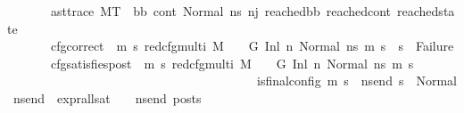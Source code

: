 \begin{isabellebody}
\ \ \ \ \ \ \ ast{\isacharunderscore}{\kern0pt}trace{\isacharcolon}{\kern0pt}\ {\isachardoublequoteopen}M{\isacharcomma}{\kern0pt}{\isasymLambda}{\isacharcomma}{\kern0pt}{\isasymGamma}{\isacharcomma}{\kern0pt}{\isasymOmega}{\isacharcomma}{\kern0pt}T\ {\isasymturnstile}\ {\isacharparenleft}{\kern0pt}bb{\isacharcomma}{\kern0pt}\ cont{}{\isacharcomma}{\kern0pt}\ {\isacharparenleft}{\kern0pt}Normal\ ns{}{\isacharparenright}{\kern0pt}{\isacharparenright}{\kern0pt}\ {\isacharminus}{\kern0pt}n{\isasymlongrightarrow}{\isacharcircum}{\kern0pt}j\ {\isacharparenleft}{\kern0pt}reached{\isacharunderscore}{\kern0pt}bb{\isacharcomma}{\kern0pt}\ reached{\isacharunderscore}{\kern0pt}cont{\isacharcomma}{\kern0pt}\ reached{\isacharunderscore}{\kern0pt}state{\isacharparenright}{\kern0pt}{\isachardoublequoteclose}\isanewline
\ \ \ \ \ \ \ cfg{\isacharunderscore}{\kern0pt}correct{\isacharcolon}{\kern0pt}\ {\isachardoublequoteopen}{\isacharparenleft}{\kern0pt}{\isasymAnd}\ m{}\ s{}{\isachardot}{\kern0pt}\ {\isacharparenleft}{\kern0pt}{\isacharparenleft}{\kern0pt}red{\isacharunderscore}{\kern0pt}cfg{\isacharunderscore}{\kern0pt}multi\ M\ {\isasymLambda}\ {\isasymGamma}\ {\isasymOmega}\ G\ {\isacharparenleft}{\kern0pt}Inl\ n{\isacharcomma}{\kern0pt}\ Normal\ ns{}{\isacharparenright}{\kern0pt}\ {\isacharparenleft}{\kern0pt}m{}{\isacharcomma}{\kern0pt}\ s{}{\isacharparenright}{\kern0pt}{\isacharparenright}{\kern0pt}\ {\isasymLongrightarrow}\ {\isacharparenleft}{\kern0pt}s{}\ {\isasymnoteq}\ Failure{\isacharparenright}{\kern0pt}{\isacharparenright}{\kern0pt}{\isacharparenright}{\kern0pt}{\isachardoublequoteclose}\isanewline
\ \ \ \ \ \ \ cfg{\isacharunderscore}{\kern0pt}satisfies{\isacharunderscore}{\kern0pt}post{\isacharcolon}{\kern0pt}\ {\isachardoublequoteopen}{\isacharparenleft}{\kern0pt}{\isasymAnd}\ m{}\ s{}{\isachardot}{\kern0pt}\ {\isacharparenleft}{\kern0pt}red{\isacharunderscore}{\kern0pt}cfg{\isacharunderscore}{\kern0pt}multi\ M\ {\isasymLambda}\ {\isasymGamma}\ {\isasymOmega}\ G\ {\isacharparenleft}{\kern0pt}Inl\ n{\isacharcomma}{\kern0pt}\ Normal\ ns{}{\isacharparenright}{\kern0pt}\ {\isacharparenleft}{\kern0pt}m{}{\isacharcomma}{\kern0pt}\ s{}{\isacharparenright}{\kern0pt}{\isacharparenright}{\kern0pt}\ {\isasymLongrightarrow}\isanewline
\ \ \ \ \ \ \ \ \ \ \ \ \ \ \ \ \ \ \ \ \ \ \ \ \ \ \ \ \ \ \ \ \ \ \ \ \ \ \ \ is{\isacharunderscore}{\kern0pt}final{\isacharunderscore}{\kern0pt}config\ {\isacharparenleft}{\kern0pt}m{}{\isacharcomma}{\kern0pt}\ s{}{\isacharparenright}{\kern0pt}\ {\isasymLongrightarrow}\ {\isasymforall}ns{\isacharunderscore}{\kern0pt}end{\isachardot}{\kern0pt}\ s{}\ {\isacharequal}{\kern0pt}\ Normal\ ns{\isacharunderscore}{\kern0pt}end\ {\isasymlongrightarrow}\ {\isacharparenleft}{\kern0pt}expr{\isacharunderscore}{\kern0pt}all{\isacharunderscore}{\kern0pt}sat\ {\isasymLambda}\ {\isasymGamma}\ {\isasymOmega}\ ns{\isacharunderscore}{\kern0pt}end{\isacharparenright}{\kern0pt}\ posts{\isacharparenright}{\kern0pt}{\isachardoublequoteclose}\isanewline

\end{isabellebody}
